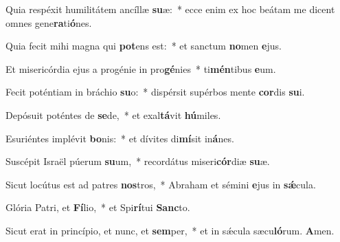 ﻿\item Quia respéxit humilitátem ancíllæ \textbf{su}æ:~* ecce enim ex hoc beátam me dicent omnes gene\textbf{ra}ti\textbf{ó}nes.

\item Quia fecit mihi magna qui \textbf{pot}ens est:~* et sanctum \textbf{no}men \textbf{e}jus.

\item Et misericórdia ejus a progénie in pro\textbf{gé}nies~* ti\textbf{mén}tibus \textbf{e}um.

\item Fecit poténtiam in bráchio \textbf{su}o:~* dispérsit supérbos mente \textbf{cor}dis \textbf{su}i.

\item Depósuit poténtes de \textbf{se}de,~* et exal\textbf{tá}vit \textbf{hú}miles.

\item Esuriéntes implévit \textbf{bo}nis:~* et dívites di\textbf{mí}sit in\textbf{á}nes.

\item Suscépit Israël púerum \textbf{su}um,~* recordátus miseri\textbf{cór}diæ \textbf{su}æ.

\item Sicut locútus est ad patres \textbf{nos}tros,~* Abraham et sémini \textbf{e}jus in \textbf{sǽ}cula.

\item Glória Patri, et \textbf{Fí}lio,~* et Spi\textbf{rí}tui \textbf{Sanc}to.

\item Sicut erat in princípio, et nunc, et \textbf{sem}per,~* et in sǽcula sæcu\textbf{ló}rum. \textbf{A}men.